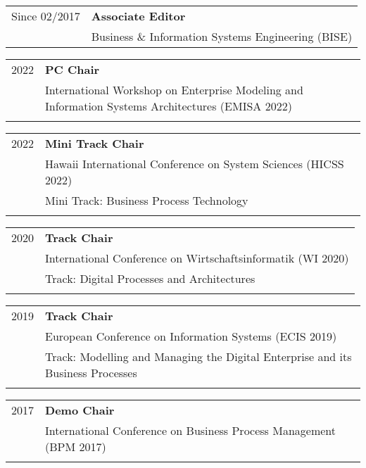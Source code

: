 \vspace{0.3cm}

\raggedright
\begin{tabular}{P{3cm}P{12cm}}
Since 02/2017 	& \textbf{Associate Editor}\\ 
							& Business \& Information Systems Engineering (BISE) \\
\end{tabular}

\vspace{0.5cm}
\vspace{0.3cm}

\raggedright
\begin{tabular}{P{3cm}P{12cm}}
2022 	& \textbf{PC Chair} \\
			&  International Workshop on Enterprise Modeling and Information Systems Architectures (EMISA 2022) \\
			& \\
\end{tabular}
\begin{tabular}{P{3cm}P{12cm}}
2022 	& \textbf{Mini Track Chair} \\
			& Hawaii International Conference on System Sciences (HICSS 2022) \\
			& Mini Track: Business Process Technology \\
			& \\
\end{tabular}
\begin{tabular}{P{3cm}P{12cm}}
2020 	& \textbf{Track Chair} \\
			& International Conference on Wirtschaftsinformatik (WI 2020) \\
			& Track: Digital Processes and Architectures \\
			& \\
\end{tabular}
\begin{tabular}{P{3cm}P{12cm}}
2019	& \textbf{Track Chair}\\ 
			& European Conference on Information Systems (ECIS 2019) \\
			& Track: Modelling and Managing the Digital Enterprise and its Business Processes \\
			& \\
			\end{tabular}
\begin{tabular}{P{3cm}P{12cm}}
2017	& \textbf{Demo Chair} \\
			& International Conference on Business Process Management (BPM 2017) \\
& \\			
			\end{tabular}
